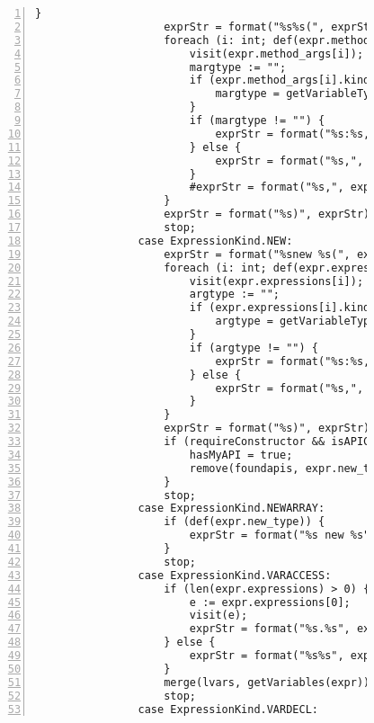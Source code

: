 \begin{figure}[ht!]
\begin{lstlisting}[numbers=left, tabsize=4, escapechar=@, caption={API Usage Mining Analysis},label={lst:aun-code}, lastline = 10]
                    }
                    exprStr = format("%s%s(", exprStr, expr.method);
                    foreach (i: int; def(expr.method_args[i])) {
                        visit(expr.method_args[i]);  
                        margtype := "";
                        if (expr.method_args[i].kind == ExpressionKind.VARACCESS) {
                            margtype = getVariableType(expr.method_args[i].variable, false);
                        }
                        if (margtype != "") {
                            exprStr = format("%s:%s,", exprStr, margtype);
                        } else {
                            exprStr = format("%s,", exprStr);    
                        }
                        #exprStr = format("%s,", exprStr);
                    }
                    exprStr = format("%s)", exprStr);
                    stop;
                case ExpressionKind.NEW:
                    exprStr = format("%snew %s(", exprStr, expr.new_type.name);
                    foreach (i: int; def(expr.expressions[i])) {
                        visit(expr.expressions[i]);  
                        argtype := "";
                        if (expr.expressions[i].kind == ExpressionKind.VARACCESS) {
                            argtype = getVariableType(expr.expressions[i].variable, false);
                        }
                        if (argtype != "") {
                            exprStr = format("%s:%s,", exprStr, argtype);
                        } else {
                            exprStr = format("%s,", exprStr);    
                        }
                    }
                    exprStr = format("%s)", exprStr);
                    if (requireConstructor && isAPIConstructor(expr.new_type.name)) {
                        hasMyAPI = true;
                        remove(foundapis, expr.new_type.name);
                    }
                    stop;
                case ExpressionKind.NEWARRAY:
                    if (def(expr.new_type)) {
                        exprStr = format("%s new %s", exprStr, expr.new_type.name);
                    }
                    stop;
                case ExpressionKind.VARACCESS:
                    if (len(expr.expressions) > 0) {
                        e := expr.expressions[0];
                        visit(e);
                        exprStr = format("%s.%s", exprStr, expr.variable);
                    } else {
                        exprStr = format("%s%s", exprStr, expr.variable);
                    }
                    merge(lvars, getVariables(expr));
                    stop;
                case ExpressionKind.VARDECL:

\end{lstlisting}
\end{figure}
